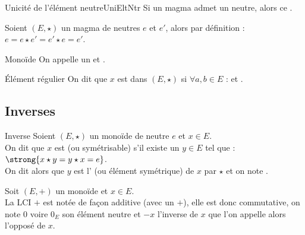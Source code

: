 \documentclass[12pt,a4paper]{report}
\begin{document}
    \begin{proposition}{Unicité de l'élément neutre}{UniEltNtr}
    Si un magma admet un neutre, alors ce .
    \end{proposition}
    
    \begin{demo}
    Soient $(E, \star)$ un magma de neutres $e$ et $e'$, alors par définition : $ e = e \star e' = e' \star e = e' $.
    \end{demo}
    
    \begin{definition}{Monoïde}{}
    On appelle  un  et .
    \end{definition}
    
    \begin{definition}{Élément régulier}{}
    On dit que $x$ est  dans $(E, \star)$ si $\forall a, b \in E$ :  et .
    \end{definition}
    
    \vspace{-0.6cm}
    
    \subsection{Inverses}
    
    \begin{definition}{Inverse}{}
    Soient $(E, \star)$ un monoïde de neutre $e$ et $x \in E$.\\
    On dit que $x$ est  (ou symétrisable) s'il existe un $y \in E$ tel que : $\strong{x \star y = y \star x = e}$.\\
    On dit alors que $y$ est l' (ou élément symétrique) de $x$ par $\star$ et on note .
    \end{definition}
    
    \begin{remarque}
    Soit $(E, +)$ un monoïde et $x \in E$.\\
    La LCI $+$ est notée de façon additive (\ie avec un $+$), elle est donc commutative, on note 0 voire $0_E$ son élément neutre et $-x$ l'inverse de $x$ que l'on appelle alors l'opposé de $x$.
    \end{remarque}
    
\end{document}
